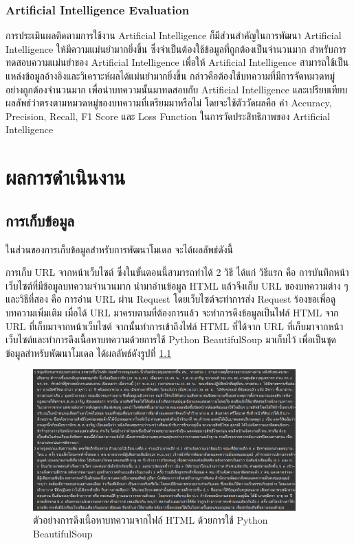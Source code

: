 \documentclass[12pt,oneside,openright,a4paper]{cpe-thai-project}
\begin{document}
\subsection{Artificial Intelligence Evaluation}
\hspace*{1cm}การประเมินผลติดตามการใช้งาน Artificial Intelligence ก็มีส่วนสำคัญในการพัฒนา Artificial Intelligence ให้มีความแม่นยำมากยิ่งขึ้น 
ซึ่งจำเป็นต้องใช้ข้อมูลที่ถูกต้องเป็นจำนวนมาก สำหรับการทดสอบความแม่นยำของ Artificial Intelligence เพื่อให้ Artificial Intelligence สามารถใช้เป็นแหล่งข้อมูลอ้างอิงและวิเคราะห์ผลได้แม่นยำมากยิ่งขึ้น
กล่าวคือต้องใช้บทความที่มีการจัดหมวดหมู่อย่างถูกต้องจำนวนมาก เพื่อนำบทความนั้นมาทดสอบกับ Artificial Intelligence และเปรียบเทียบผลลัพธ์ว่าตรงตามหมวดหมู่ของบทความที่เตรียมมาหรือไม่
โดยจะใช้ตัววัดผลคือ ค่า Accuracy, Precision, Recall, F1 Score และ Loss Function ในการวัดประสิทธิภาพของ Artificial Intelligence


\chapter{ผลการดำเนินงาน}

  \section{การเก็บข้อมูล}
    \hspace{1cm}ในส่วนของการเก็บข้อมูลสำหรับการพัฒนาโมเดล จะได้ผลลัพธ์ดังนี้

    \hspace{1cm}การเก็บ URL จากหน้าเว็บไซต์ ซึ่งในขั้นตอนนี้สามารถทำได้ 2 วิธี ได้แก่ วิธีแรก คือ การบันทึกหน้าเว็บไซต์ที่มีข้อมูลบทความจำนวนมาก นำมาอ่านข้อมูล HTML 
    แล้วจึงเก็บ URL ของบทความต่าง ๆ และวิธีที่สอง คือ การอ่าน URL ผ่าน Request โดยเว็บไซต์จะทำการส่ง Request ร้องขอเพื่อดูบทความเพิ่มเติม 
    เมื่อได้ URL มาครบตามที่ต้องการแล้ว จะทำการดึงข้อมูลเป็นไฟล์ HTML จาก URL ที่เก็บมาจากหน้าเว็บไซต์ 
    จากนั้นทำการเข้าถึงไฟล์ HTML ที่ได้จาก URL ที่เก็บมาจากหน้าเว็บไซต์และทำการดึงเนื้อหาบทความด้วยการใช้ Python BeautifulSoup มาเก็บไว้ 
    เพื่อเป็นชุดข้อมูลสำหรับพัฒนาโมเดล ได้ผลลัพธ์ดังรูปที่ \ref{fig:data_thai}
    \begin{figure}[!ht]\centering
      \includegraphics[width=0.9\textwidth]{./img/data_col_thai.png}
      \caption{ตัวอย่างการดึงเนื้อหาบทความจากไฟล์ HTML ด้วยการใช้ Python BeautifulSoup}\label{fig:data_thai}
    \end{figure}
\end{document}
